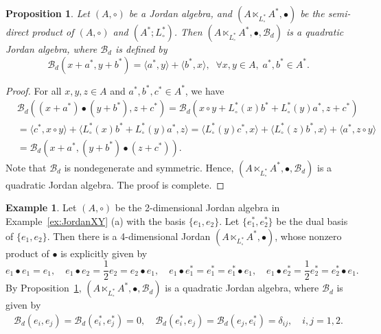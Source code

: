 \documentclass[12pt, reqno, a4paper]{amsart}
\newtheorem{proposition}[theorem]{Proposition}
\theoremstyle{definition}
\newtheorem{example}[theorem]{Example}
\begin{document}
\begin{proposition}\label{GouzaoQJA}
	Let $(A, \circ)$ be a Jordan algebra, and $(A \ltimes_{L_{\circ}^{*}} A^{*}, \bullet)$ be the semi-direct product of $(A, \circ)$ and $(A^*; L_{\circ}^*)$.
	Then $(A \ltimes_{L_{\circ}^{*}} A^{*}, \bullet, \mathcal{B}_d )$ is a quadratic Jordan algebra, where $\mathcal{B}_d$ is defined by
	\begin{equation}
		\mathcal{B}_{d}(x+a^{*}, y+b^{*})= \langle a^{*}, y \rangle + \langle b^{*}, x \rangle, \;\; \forall x, y \in A, \; a^{*}, b^{*} \in A^{*}. \label{eq:abm}
	\end{equation}
\end{proposition}
\begin{proof}
	For all $x, y,z \in A$ and $a^{*}, b^{*},c^{*}\in A^{*}$, we have
	\begin{align*}
		 & \mathcal{B}_{d}((x+a^{*}) \bullet (y+b^{*}),z + c^{*}) = \mathcal{B}_{d}(x \circ y + L_{\circ}^{*}(x) b^{*}+ L_{\circ}^{*}(y) a^{*},z + c^{*})                                                                                   \\
		 & =\langle c^{*}, x \circ y \rangle + \langle L_{\circ}^{*}(x) b^{*}+ L_{\circ}^{*}(y) a^{*}, z \rangle  =\langle L_{\circ}^{*}(y)c^{*}, x \rangle + \langle L_{\circ}^{*}(z)b^{*} , x \rangle + \langle a^{*}, z \circ y \rangle \\
		 & =\mathcal{B}_{d}( x+a^{*}, (y+b^{*})\bullet (z + c^{*})).
	\end{align*}
	Note that $\mathcal{B}_{d}$ is nondegenerate and symmetric.
	Hence, $(A \ltimes_{L_{\circ}^{*}} A^{*}, \bullet, \mathcal{B}_d )$ is a quadratic Jordan algebra.
	The proof is complete.
\end{proof}

\begin{example}\label{ex:Jordan3}
	Let $(A, \circ)$ be the 2-dimensional Jordan algebra in Example~\ref{ex:JordanXY} (a) with the basis $\{e_{1}, e_{2}\}$. 
	Let $\{e_1^*, e_2^*\}$ be the dual basis of $\{e_1, e_2\}$. 
	Then there is a 4-dimensional Jordan $(A \ltimes_{L_{\circ}^{*}} A^*, \bullet)$, whose nonzero product of $\bullet$ is explicitly given by 
	\begin{equation*}
		e_1 \bullet e_1 = e_1, \quad
		e_1 \bullet e_2 = \frac{1}{2} e_2 = e_2 \bullet e_1, \quad
		e_1 \bullet e_1^* =e_1^* = e_1^* \bullet e_1, \quad
		e_1 \bullet e_2^* =\frac{1}{2}e_2^* = e_2^* \bullet e_1.
	\end{equation*}
	By Proposition~\ref{GouzaoQJA}, $(A \ltimes_{L_{\circ}^{*}} A^{*}, \bullet, \mathcal{B}_d )$ is a quadratic Jordan algebra, where $\mathcal{B}_d$ is given by
	\begin{align*}
		\mathcal{B}_d(e_i, e_j) = \mathcal{B}_d(e_i^*, e_j^*) = 0, \quad \mathcal{B}_d(e_i^*, e_j) = \mathcal{B}_d(e_j, e_i^*) = \delta_{ij}, \quad i, j=1, 2.
	\end{align*}
\end{example}
\end{document}
